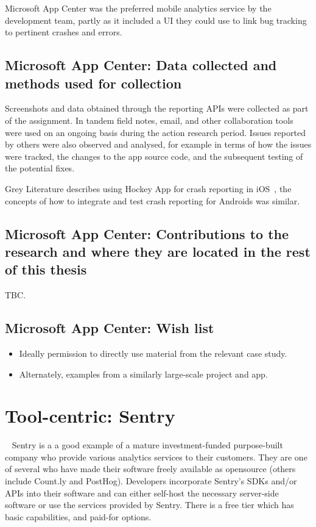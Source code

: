 Microsoft App Center was the preferred mobile analytics service by the development team, partly as it included a UI they could use to link bug tracking to pertinent crashes and errors.

\subsection{Microsoft App Center: Data collected and methods used for collection}
Screenshots and data obtained through the reporting APIs were collected as part of the assignment. In tandem field notes, email, and other collaboration tools were used on an ongoing basis during the action research period. Issues reported by others were also observed and analysed, for example in terms of how the issues were tracked, the changes to the app source code, and the subsequent testing of the potential fixes.

Grey Literature describes using Hockey App for crash reporting in iOS~\citep{birani2016_hockey_app_for_crash_reporting}, the concepts of how to integrate and test crash reporting for Androids was similar.

\subsection{Microsoft App Center: Contributions to the research and where they are located in the rest of this thesis}
TBC.

\subsection*{Microsoft App Center: Wish list}
{\small
\begin{itemize}
    \item Ideally permission to directly use material from the relevant case study.
    \item Alternately, examples from a similarly large-scale project and app.
\end{itemize}
}
\clearpage


\section{Tool-centric: Sentry}~\label{case-study-overview-sentry}
Sentry is a a good example of a mature investment-funded purpose-built company who provide various analytics services to their customers. They are one of several who have made their software freely available as opensource (others include Count.ly and PostHog). Developers incorporate Sentry's SDKs and/or APIs into their software and can either self-host the necessary server-side software or use the services provided by Sentry. There is a free tier which has basic capabilities, and paid-for options.

